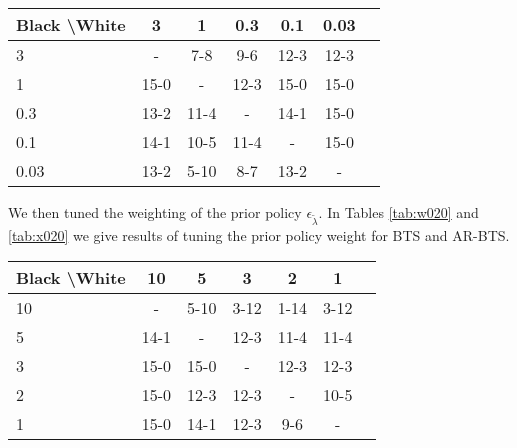 \documentclass{article}
\theoremstyle{plain}
\begin{document}
\begin{appendices}
            \begin{table*}[]
            \centering
                \begin{tabular}{l|cccccc}
                    \textbf{Black \textbackslash White}     & 3  & 1   & 0.3   & 0.1    & 0.03    \\ 
                    \hline
                                            3            & -     	& 7-8  		& 9-6  		&  12-3 		& 12-3  		\\
                                            1            & 15-0 & - & 12-3 & 15-0 & 15-0   		\\
                                            0.3          & 13-2 & 11-4 & - & 14-1 & 15-0  		\\
                                            0.1          & 14-1 & 10-5 & 11-4 & - & 15-0   		\\
                                            0.03         & 13-2 & 5-10 & 8-7 & 13-2 &   -   	\\    
                \end{tabular}
                \caption{Results for round robin to select the temperature parameter $\alpha_{\text{init}}$ for AR-BTS. The value of 1.0 won all four of its matches so was selected. \label{tab:x001}}
            \end{table*}
            
            
            
            
            
            
            We then tuned the weighting of the prior policy $\epsilon_{\tilde{\lambda}}$. In Tables \ref{tab:w020} and \ref{tab:x020} we give results of tuning the prior policy weight for BTS and AR-BTS.
            
            \begin{table*}[]
            \centering
                \begin{tabular}{l|cccccc}
                    \textbf{Black \textbackslash White}     & 10  & 5   & 3   & 2    & 1    \\ 
                    \hline
                                            10            & - & 5-10 & 3-12 & 1-14 &  3-12  		\\
                                            5            & 14-1 & - & 12-3 & 11-4 & 11-4   		\\
                                            3          & 15-0 & 15-0 & - & 12-3 & 12-3   		\\
                                            2          & 15-0 & 12-3 & 12-3 & - & 10-5   		\\
                                            1         & 15-0 & 14-1 & 12-3 & 9-6 &   -   	\\    
                \end{tabular}
                \caption{Results for round robin to select the weighting of the prior policy $\epsilon_{\tilde{\lambda}}$ for BTS. The value of 2.0 won the most matches so was selected. \label{tab:w020}}
            \end{table*}
            

\end{appendices}
\end{document}
